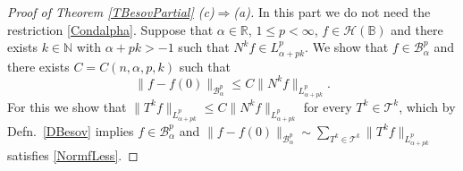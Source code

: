 \documentclass{amsart}
\theoremstyle{definition}
\theoremstyle{remark}
\begin{document}
\begin{proof}[Proof of Theorem \ref{TBesovPartial} (c)$\Rightarrow$(a)]
In this part we do not need the restriction \eqref{Condalpha}.
Suppose that $\alpha\in\mathbb R$, $1\le p<\infty$, $f\in\mathcal H(\mathbb B)$
and there exists $k\in\mathbb N$ with $\alpha+pk>-1$ such that
$N^k f\in L^p_{\alpha+pk}$.
We show that $f\in\mathcal B^p_\alpha$ and there exists $C=C(n,\alpha,p,k)$
such that
\begin{equation}\label{NormfLess}
\|f-f(0)\|_{\mathcal B^p_\alpha}\le C\|N^k f\|_{L^p_{\alpha+pk}}.
\end{equation}
For this we show that
$\|T^k f\|_{L^p_{\alpha+pk}}\le C\|N^k f\|_{L^p_{\alpha+pk}}$
for every $T^k\in\mathcal T^k$, which by Defn.~\ref{DBesov}
implies $f\in\mathcal B^p_\alpha$ and
$\|f-f(0)\|_{\mathcal B^p_\alpha}
\sim\sum_{T^k\in\mathcal T^k}\|T^k f\|_{L^p_{\alpha+pk}}$
satisfies \eqref{NormfLess}.


\end{proof}
\end{document}
